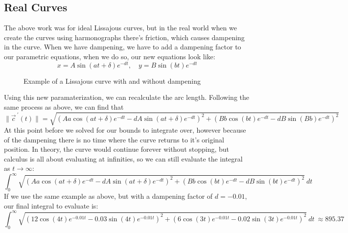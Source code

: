 \subsection{Real Curves}
The above work was for ideal Lissajous curves, but in the real world when we create the curves using harmonographs there's friction, which causes dampening in the curve. When we have dampening, we have to add a dampening factor to our parametric equations, when we do so, our new equations look like: \[x=A \sin (a t+\delta)e^{-dt}, \quad y=B \sin (b t)e^{-dt}\]

\begin{figure}[h]
\caption{Example of a Lissajous curve with and without dampening}
\end{figure}
\newpage

Using this new paramaterization, we can recalculate the arc length. Following the same process as above, we can find that \[\|\vec{c}^{\ \prime}(t)\| = \sqrt{ (Aa\cos(at+\delta)e^{-dt} - dA\sin(at+\delta)e^{-dt})^2 +  (Bb\cos(bt)e^{-dt} - dB\sin(Bb)e^{-dt})^2}\] At this point before we solved for our bounds to integrate over, however because of the dampening there is no time where the curve returns to it's original position. In theory, the curve would continue forever without stopping, but calculus is all about evaluating at infinities, so we can still evaluate the integral as $t\rightarrow \infty$: \[\int_{0}^{\infty}\sqrt{ (Aa\cos(at+\delta)e^{-dt} - dA\sin(at+\delta)e^{-dt})^2 +  (Bb\cos(bt)e^{-dt} - dB\sin(bt)e^{-dt})^2}\ dt\] If we use the same example as above, but with a dampening factor of $d=-0.01$, our final integral to evaluate is: \[\int_{0}^{\infty}\sqrt{ (12\cos(4t)e^{-0.01t} - 0.03\sin(4t)e^{-0.01t})^2 +  (6\cos(3t)e^{-0.01t} - 0.02\sin(3t)e^{-0.01t})^2}\ dt\ \approx 895.37\]
